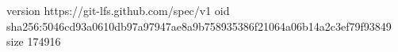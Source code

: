 version https://git-lfs.github.com/spec/v1
oid sha256:5046cd93a0610db97a97947ae8a9b758935386f21064a06b14a2c3ef79f93849
size 174916
